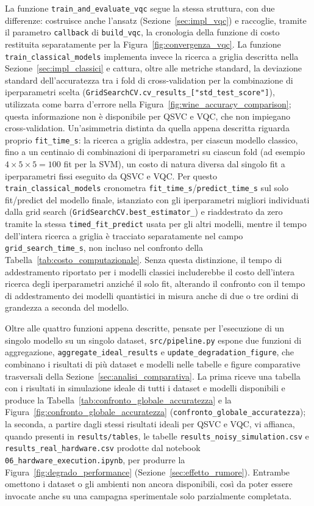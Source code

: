 La funzione \texttt{train\_and\_evaluate\_vqc} segue la stessa struttura, con due differenze: costruisce anche l'ansatz (Sezione~\ref{sec:impl_vqc}) e raccoglie, tramite il parametro \texttt{callback} di \texttt{build\_vqc}, la cronologia della funzione di costo restituita separatamente per la Figura~\ref{fig:convergenza_vqc}. La funzione \texttt{train\_classical\_models} implementa invece la ricerca a griglia descritta nella Sezione~\ref{sec:impl_classici} e cattura, oltre alle metriche standard, la deviazione standard dell'accuratezza tra i fold di cross-validation per la combinazione di iperparametri scelta \newline(\texttt{GridSearchCV.cv\_results\_["std\_test\_score"]}), utilizzata come barra d'errore nella Figura~\ref{fig:wine_accuracy_comparison}; questa informazione non è disponibile per QSVC e VQC, che non impiegano cross-validation. Un'asimmetria distinta da quella appena descritta riguarda proprio \texttt{fit\_time\_s}: la ricerca a griglia addestra, per ciascun modello classico, fino a un centinaio di combinazioni di iperparametri su ciascun fold (ad esempio $4 \times 5 \times 5 = 100$ fit per la SVM), un costo di natura diversa dal singolo fit a iperparametri fissi eseguito da QSVC e VQC. Per questo \texttt{train\_classical\_models} cronometra \texttt{fit\_time\_s}/\texttt{predict\_time\_s} sul solo fit/predict del modello finale, istanziato con gli iperparametri migliori individuati dalla grid search (\texttt{GridSearchCV.best\_estimator\_}) e riaddestrato da zero tramite la stessa \texttt{timed\_fit\_predict} usata per gli altri modelli, mentre il tempo dell'intera ricerca a griglia è tracciato separatamente nel campo \texttt{grid\_search\_time\_s}, non incluso nel confronto della Tabella~\ref{tab:costo_computazionale}. Senza questa distinzione, il tempo di addestramento riportato per i modelli classici includerebbe il costo dell'intera ricerca degli iperparametri anziché il solo fit, alterando il confronto con il tempo di addestramento dei modelli quantistici in misura anche di due o tre ordini di grandezza a seconda del modello.

Oltre alle quattro funzioni appena descritte, pensate per l'esecuzione di un singolo modello su un singolo dataset, \texttt{src/pipeline.py} espone due funzioni di aggregazione, \texttt{aggregate\_ideal\_results} e \texttt{update\_degradation\_figure}, che combinano i risultati di più dataset e modelli nelle tabelle e figure comparative trasversali della Sezione~\ref{sec:analisi_comparativa}. La prima riceve una tabella con i risultati in simulazione ideale di tutti i dataset e modelli disponibili e produce la Tabella~\ref{tab:confronto_globale_accuratezza} e la Figura~\ref{fig:confronto_globale_accuratezza} (\texttt{confronto\_globale\_accuratezza}); la seconda, a partire dagli stessi risultati ideali per QSVC e VQC, vi affianca, quando presenti in \texttt{results/tables}, le tabelle \texttt{results\_noisy\_simulation.csv} e \texttt{results\_real\_hardware.csv} prodotte dal notebook \texttt{06\_hardware\_execution.ipynb}, per produrre la Figura~\ref{fig:degrado_performance} (Sezione~\ref{sec:effetto_rumore}). Entrambe omettono i dataset o gli ambienti non ancora disponibili, così da poter essere invocate anche su una campagna sperimentale solo parzialmente completata.

